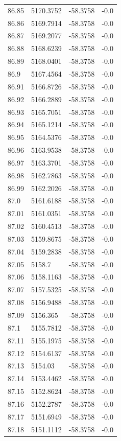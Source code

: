 \begin{table}[H]
\begin{tabular}{llll}
86.85 & 5170.3752 & -58.3758 & -0.0 \\
86.86 & 5169.7914 & -58.3758 & -0.0 \\
86.87 & 5169.2077 & -58.3758 & -0.0 \\
86.88 & 5168.6239 & -58.3758 & -0.0 \\
86.89 & 5168.0401 & -58.3758 & -0.0 \\
86.9 & 5167.4564 & -58.3758 & -0.0 \\
86.91 & 5166.8726 & -58.3758 & -0.0 \\
86.92 & 5166.2889 & -58.3758 & -0.0 \\
86.93 & 5165.7051 & -58.3758 & -0.0 \\
86.94 & 5165.1214 & -58.3758 & -0.0 \\
86.95 & 5164.5376 & -58.3758 & -0.0 \\
86.96 & 5163.9538 & -58.3758 & -0.0 \\
86.97 & 5163.3701 & -58.3758 & -0.0 \\
86.98 & 5162.7863 & -58.3758 & -0.0 \\
86.99 & 5162.2026 & -58.3758 & -0.0 \\
87.0 & 5161.6188 & -58.3758 & -0.0 \\
87.01 & 5161.0351 & -58.3758 & -0.0 \\
87.02 & 5160.4513 & -58.3758 & -0.0 \\
87.03 & 5159.8675 & -58.3758 & -0.0 \\
87.04 & 5159.2838 & -58.3758 & -0.0 \\
87.05 & 5158.7 & -58.3758 & -0.0 \\
87.06 & 5158.1163 & -58.3758 & -0.0 \\
87.07 & 5157.5325 & -58.3758 & -0.0 \\
87.08 & 5156.9488 & -58.3758 & -0.0 \\
87.09 & 5156.365 & -58.3758 & -0.0 \\
87.1 & 5155.7812 & -58.3758 & -0.0 \\
87.11 & 5155.1975 & -58.3758 & -0.0 \\
87.12 & 5154.6137 & -58.3758 & -0.0 \\
87.13 & 5154.03 & -58.3758 & -0.0 \\
87.14 & 5153.4462 & -58.3758 & -0.0 \\
87.15 & 5152.8624 & -58.3758 & -0.0 \\
87.16 & 5152.2787 & -58.3758 & -0.0 \\
87.17 & 5151.6949 & -58.3758 & -0.0 \\
87.18 & 5151.1112 & -58.3758 & -0.0 \\

\end{tabular}
\end{table}
